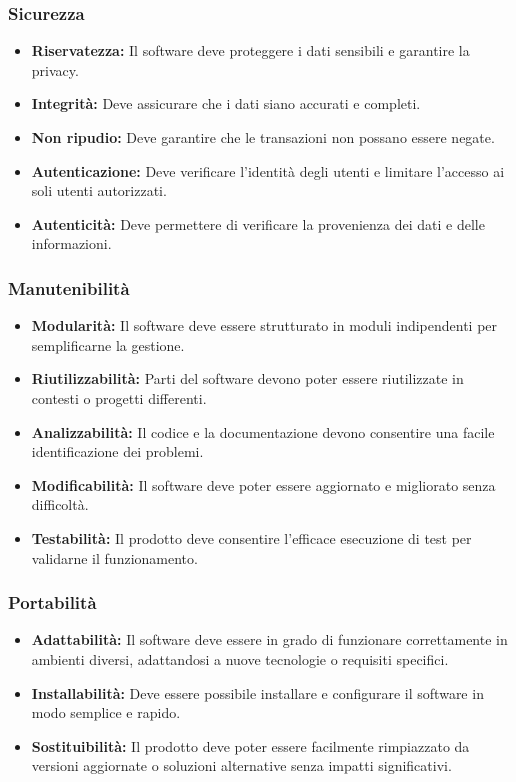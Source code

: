 \subsubsection{Sicurezza}
\begin{itemize}
    \item \textbf{Riservatezza:} Il software deve proteggere i dati sensibili e garantire la privacy.
    \item \textbf{Integrità:} Deve assicurare che i dati siano accurati e completi.
    \item \textbf{Non ripudio:} Deve garantire che le transazioni non possano essere negate.
    \item \textbf{Autenticazione:} Deve verificare l'identità degli utenti e limitare l’accesso ai soli utenti autorizzati.
    \item \textbf{Autenticità:} Deve permettere di verificare la provenienza dei dati e delle informazioni.
\end{itemize}

\subsubsection{Manutenibilità}
\begin{itemize}
    \item \textbf{Modularità:} Il software deve essere strutturato in moduli indipendenti per semplificarne la gestione.
    \item \textbf{Riutilizzabilità:} Parti del software devono poter essere riutilizzate in contesti o progetti differenti.
    \item \textbf{Analizzabilità:} Il codice e la documentazione devono consentire una facile identificazione dei problemi.
    \item \textbf{Modificabilità:} Il software deve poter essere aggiornato e migliorato senza difficoltà.
    \item \textbf{Testabilità:} Il prodotto deve consentire l’efficace esecuzione di test per validarne il funzionamento.
\end{itemize}

\subsubsection{Portabilità}
\begin{itemize}
    \item \textbf{Adattabilità:} Il software deve essere in grado di funzionare correttamente in ambienti diversi, adattandosi a nuove tecnologie o requisiti specifici.
    \item \textbf{Installabilità:} Deve essere possibile installare e configurare il software in modo semplice e rapido.
    \item \textbf{Sostituibilità:} Il prodotto deve poter essere facilmente rimpiazzato da versioni aggiornate o soluzioni alternative senza impatti significativi.
\end{itemize}

